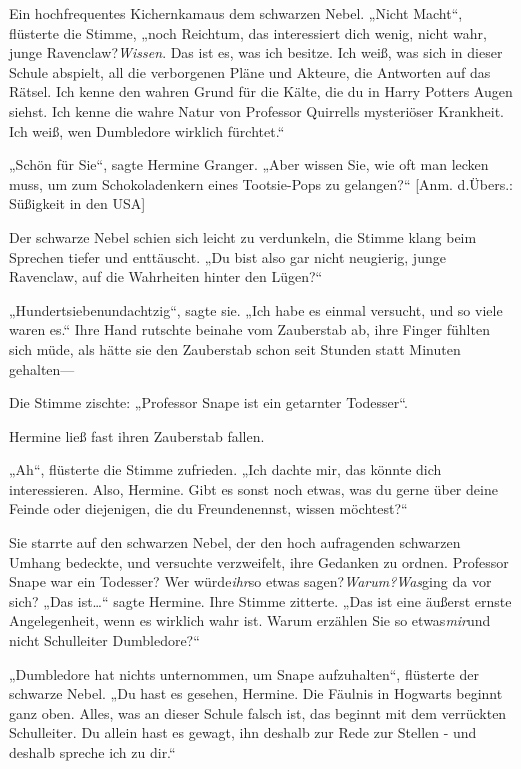 {Ein hochfrequentes Kichernkamaus dem schwarzen Nebel. „Nicht Macht“, flüsterte die Stimme, „noch Reichtum, das interessiert dich wenig, nicht wahr, junge Ravenclaw?\emph{Wissen}. Das ist es, was ich besitze. Ich weiß, was sich in dieser Schule abspielt, all die verborgenen Pläne und Akteure, die Antworten auf das Rätsel. Ich kenne den wahren Grund für die Kälte, die du in Harry Potters Augen siehst. Ich kenne die wahre Natur von Professor Quirrells mysteriöser Krankheit. Ich weiß, wen Dumbledore wirklich fürchtet.“

„Schön für Sie“, sagte Hermine Granger. „Aber wissen Sie, wie oft man lecken muss, um zum Schokoladenkern eines Tootsie-Pops zu gelangen?“ {[}Anm. d.Übers.: Süßigkeit in den USA{]}

Der schwarze Nebel schien sich leicht zu verdunkeln, die Stimme klang beim Sprechen tiefer und enttäuscht. „Du bist also gar nicht neugierig, junge Ravenclaw, auf die Wahrheiten hinter den Lügen?“

„Hundertsiebenundachtzig“, sagte sie. „Ich habe es einmal versucht, und so viele waren es.“ Ihre Hand rutschte beinahe vom Zauberstab ab, ihre Finger fühlten sich müde, als hätte sie den Zauberstab schon seit Stunden statt Minuten gehalten—

Die Stimme zischte: „Professor Snape ist ein getarnter Todesser“.

Hermine ließ fast ihren Zauberstab fallen.

„Ah“, flüsterte die Stimme zufrieden. „Ich dachte mir, das könnte dich interessieren. Also, Hermine. Gibt es sonst noch etwas, was du gerne über deine Feinde oder diejenigen, die du Freundenennst, wissen möchtest?“

Sie starrte auf den schwarzen Nebel, der den hoch aufragenden schwarzen Umhang bedeckte, und versuchte verzweifelt, ihre Gedanken zu ordnen. Professor Snape war ein Todesser? Wer würde\emph{ihr}so etwas sagen?\emph{Warum?Was}ging da vor sich? „Das ist…“ sagte Hermine. Ihre Stimme zitterte. „Das ist eine äußerst ernste Angelegenheit, wenn es wirklich wahr ist. Warum erzählen Sie so etwas\emph{mir}und nicht Schulleiter Dumbledore?“

„Dumbledore hat nichts unternommen, um Snape aufzuhalten“, flüsterte der schwarze Nebel. „Du hast es gesehen, Hermine. Die Fäulnis in Hogwarts beginnt ganz oben. Alles, was an dieser Schule falsch ist, das beginnt mit dem verrückten Schulleiter. Du allein hast es gewagt, ihn deshalb zur Rede zur Stellen - und deshalb spreche ich zu dir.“

}
